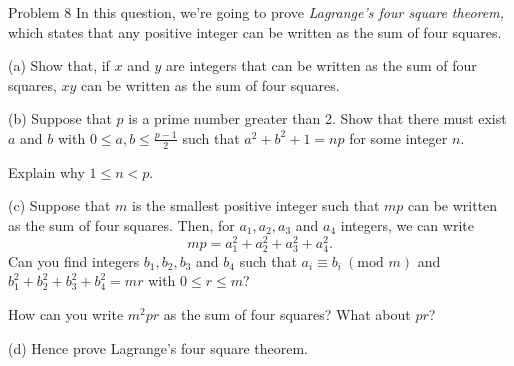 \documentclass{article}
\begin{document}
\begin{problem}{Problem 8}
In this question, we're going to prove \textit{Lagrange's four square
theorem,} which states that any positive integer can be written as the sum
of four squares. \vspace{0.2cm}

(a) Show that, if $x$ and $y$ are integers that can be written as the sum of
four squares, $xy$ can be written as the sum of four squares. \vspace{0.2cm}

(b) Suppose that $p$ is a prime number greater than 2. Show that there must
exist $a$ and $b$ with $0 \leq a,b \leq \frac{p-1}{2}$ such that
$a^2 + b^2 + 1 = np$ for some integer $n$. \vspace{0.2cm}

Explain why $1 \leq n < p$.
\vspace{0.2cm}

(c) Suppose that $m$ is the smallest positive integer such that $mp$ can
be written as the sum of four squares. Then, for $a_1, a_2, a_3$ and
$a_4$ integers, we can write
$$
mp = a_1^2 + a_2^2 + a_3^2 + a_4^2.
$$
Can you find integers $b_1, b_2, b_3$ and $b_4$ such that
$a_i \equiv b_i \ (\text{mod } m)$ and $b_1^2 + b_2^2 + b_3^2 + b_4^2 = mr$
with $0 \leq r \leq m$? \vspace{-0.2cm}

How can you write $m^2 pr$ as the sum of four squares? What about $pr$?
\vspace{0.2cm}

(d) Hence prove Lagrange's four square theorem.
\end{problem}
\end{document}
